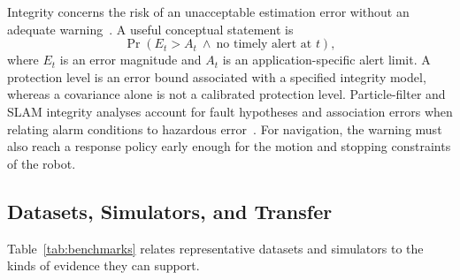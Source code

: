 Integrity concerns the risk of an unacceptable estimation error without an adequate warning~\cite{B_GNSSIntegrity2018}. A useful conceptual statement is
\begin{equation}
\Pr\!\left(E_t>A_t\ \land\ \text{no timely alert at }t\right),
\label{eq:integrity}
\end{equation}
where $E_t$ is an error magnitude and $A_t$ is an application-specific alert limit. A protection level is an error bound associated with a specified integrity model, whereas a covariance alone is not a calibrated protection level. Particle-filter and SLAM integrity analyses account for fault hypotheses and association errors when relating alarm conditions to hazardous error~\cite{P_M28,P_X07}. For navigation, the warning must also reach a response policy early enough for the motion and stopping constraints of the robot.

\subsection{Datasets, Simulators, and Transfer}
Table~\ref{tab:benchmarks} relates representative datasets and simulators to the kinds of evidence they can support.


